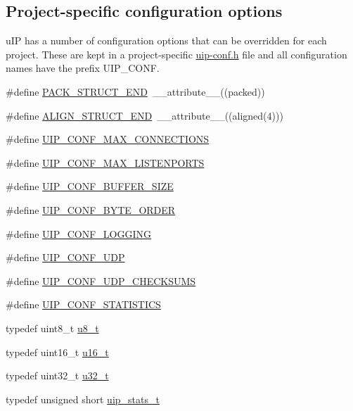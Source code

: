\subsection*{Project-\/specific configuration options}
\label{_amgrpa633c8dacb583c46c2a4af56ab61e8ca}
 uIP has a number of configuration options that can be overridden for each project. These are kept in a project-\/specific \hyperlink{uip-conf_8h}{uip-\/conf.h} file and all configuration names have the prefix UIP\_\-CONF. \begin{DoxyCompactItemize}
\item 
\#define \hyperlink{group__uipfw_gae92a74cc7ea3eba5d3d56b9caa77d2ad}{PACK\_\-STRUCT\_\-END}~\_\-\_\-attribute\_\-\_\-((packed))
\item 
\#define \hyperlink{group__uipfw_ga8dbc55e1183365cafdd75d7c18215bb2}{ALIGN\_\-STRUCT\_\-END}~\_\-\_\-attribute\_\-\_\-((aligned(4)))
\item 
\#define \hyperlink{group__uipfw_ga3f6f1f6f98431f2d33ed30a30d2ccc35}{UIP\_\-CONF\_\-MAX\_\-CONNECTIONS}
\item 
\#define \hyperlink{group__uipfw_ga974c9b4bbe6b07cc1d64ac4fad278030}{UIP\_\-CONF\_\-MAX\_\-LISTENPORTS}
\item 
\#define \hyperlink{group__uipfw_gacacc406c3bf7d0e00412e4c946252739}{UIP\_\-CONF\_\-BUFFER\_\-SIZE}
\item 
\#define \hyperlink{group__uipfw_gaca1240bba5dd57f8c7c27123c84a1f6d}{UIP\_\-CONF\_\-BYTE\_\-ORDER}
\item 
\#define \hyperlink{group__uipfw_ga3001114ddadc1f2ada5cc9a780e866fc}{UIP\_\-CONF\_\-LOGGING}
\item 
\#define \hyperlink{group__uipfw_ga763f12007aad8cc0e483bf50f8a8d9b4}{UIP\_\-CONF\_\-UDP}
\item 
\#define \hyperlink{group__uipfw_ga9dd44616d41cef74d3beb51d8be5ecec}{UIP\_\-CONF\_\-UDP\_\-CHECKSUMS}
\item 
\#define \hyperlink{group__uipfw_ga529648ad3b0b327a43689b0f1779ff55}{UIP\_\-CONF\_\-STATISTICS}
\item 
typedef uint8\_\-t \hyperlink{group__uipfw_ga4caecabca98b43919dd11be1c0d4cd8e}{u8\_\-t}
\item 
typedef uint16\_\-t \hyperlink{group__uipfw_ga77570ac4fcab86864fa1916e55676da2}{u16\_\-t}
\item 
typedef uint32\_\-t \hyperlink{group__uipfw_ga4c14294869aceba3ef9d4c0c302d0f33}{u32\_\-t}
\item 
typedef unsigned short \hyperlink{group__uipfw_ga727459e5c4f777543c81ffffa3df3f0c}{uip\_\-stats\_\-t}
\end{DoxyCompactItemize}


